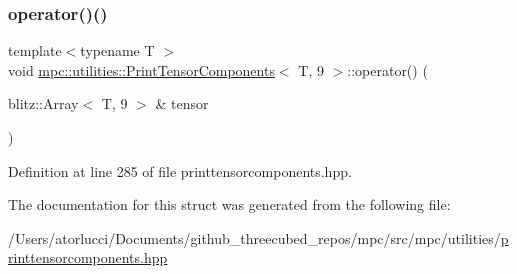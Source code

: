 \subsubsection{\texorpdfstring{operator()()}{operator()()}}
{\footnotesize\ttfamily template$<$typename T $>$ \\
void \mbox{\hyperlink{structmpc_1_1utilities_1_1_print_tensor_components}{mpc\+::utilities\+::\+Print\+Tensor\+Components}}$<$ T, 9 $>$\+::operator() (\begin{DoxyParamCaption}\item[{blitz\+::\+Array$<$ T, 9 $>$ \&}]{tensor }\end{DoxyParamCaption})\hspace{0.3cm}{\ttfamily [inline]}}



Definition at line 285 of file printtensorcomponents.\+hpp.



The documentation for this struct was generated from the following file\+:\begin{DoxyCompactItemize}
\item 
/\+Users/atorlucci/\+Documents/github\+\_\+threecubed\+\_\+repos/mpc/src/mpc/utilities/\mbox{\hyperlink{printtensorcomponents_8hpp}{printtensorcomponents.\+hpp}}\end{DoxyCompactItemize}
